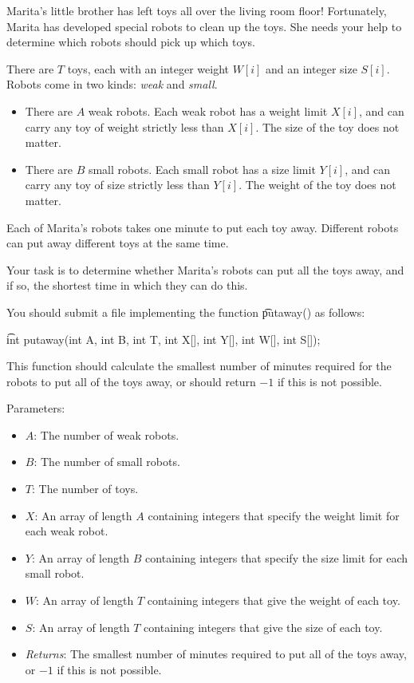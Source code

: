 Marita's little brother has left toys all over the living room floor! Fortunately, Marita has developed special robots to clean up the toys. She needs your help to determine which robots should pick up which toys.

There are $T$ toys, each with an integer weight $W[i]$ and an integer size $S[i]$. Robots come in two kinds: \textit{weak} and \textit{small}.
\begin{itemize}
\item There are $A$ weak robots. Each weak robot has a weight limit $X[i]$, and can carry any toy of weight strictly less than $X[i]$. The size of the toy does not matter.
\item There are $B$ small robots. Each small robot has a size limit $Y[i]$, and can carry any toy of size strictly less than $Y[i]$. The weight of the toy does not matter.
\end{itemize}


Each of Marita's robots takes one minute to put each toy away. Different robots can put away different toys at the same time.

Your task is to determine whether Marita's robots can put all the toys away, and if so, the shortest time in which they can do this.

You should submit a file implementing the function \t{putaway()} as follows: 

\t{int putaway(int A, int B, int T, int X[], int Y[], int W[], int S[]);}

This function should calculate the smallest number of minutes required for the robots to put all of the toys away, or should return $-­1$ if this is not possible.

Parameters:
\begin{itemize}
\item $A$: The number of weak robots.
\item $B$: The number of small robots.
\item $T$: The number of toys.
\item $X$: An array of length $A$ containing integers that specify the weight limit for each weak robot.
\item $Y$: An array of length $B$ containing integers that specify the size limit for each small robot.
\item $W$: An array of length $T$ containing integers that give the weight of each toy.
\item $S$: An array of length $T$ containing integers that give the size of each toy.
\item \textit{Returns}: The smallest number of minutes required to put all of the toys away, or ­$-1$ if this is not possible.
\end{itemize}
